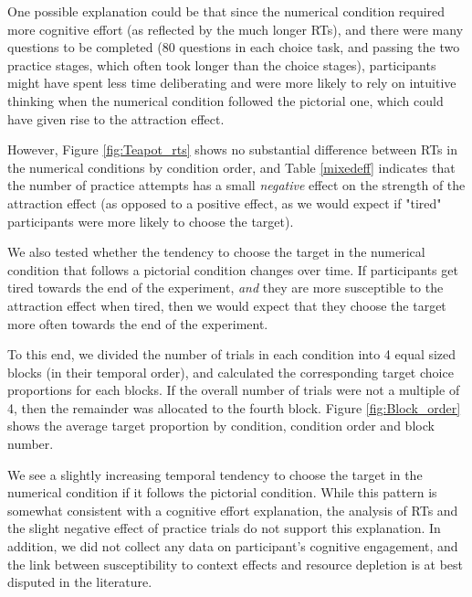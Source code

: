 \documentclass[11pt,a4paper]{article}
\begin{document}
One possible explanation could be that since the numerical condition required more cognitive effort (as reflected by the much longer RTs), and there were many questions to be completed (80 questions in each choice task, and passing the two practice stages, which often took longer than the choice stages), participants might have spent less time deliberating and were more likely to rely on intuitive thinking when the numerical condition followed the pictorial one, which could have given rise to the attraction effect. 

However, Figure \ref{fig:Teapot_rts} shows no substantial difference between RTs in the numerical conditions by condition order, and Table \ref{mixedeff} indicates that the number of practice attempts has a small \textit{negative} effect on the strength of the attraction effect (as opposed to a positive effect, as we would expect if "tired" participants were more likely to choose the target).

We also tested whether the tendency to choose the target in the numerical condition that follows a pictorial condition changes over time. If participants get tired towards the end of the experiment, \textit{and} they are more susceptible to the attraction effect when tired, then we would expect that they choose the target more often towards the end of the experiment. 

To this end, we divided the number of trials in each condition into 4 equal sized blocks (in their temporal order), and calculated the corresponding target choice proportions for each blocks. If the overall number of trials were not a multiple of 4, then the remainder was allocated to the fourth block. Figure \ref{fig:Block_order} shows the average target proportion by condition, condition order and block number.

We see a slightly increasing temporal tendency to choose the target in the numerical condition if it follows the pictorial condition. While this pattern is somewhat consistent with a cognitive effort explanation, the analysis of RTs and the slight negative effect of practice trials do not support this explanation. In addition, we did not collect any data on participant's cognitive engagement, and the link between susceptibility to context effects and resource depletion is at best disputed in the literature. 
\end{document}
